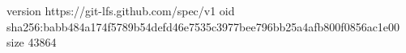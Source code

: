version https://git-lfs.github.com/spec/v1
oid sha256:babb484a174f5789b54defd46e7535c3977bee796bb25a4afb800f0856ac1e00
size 43864
